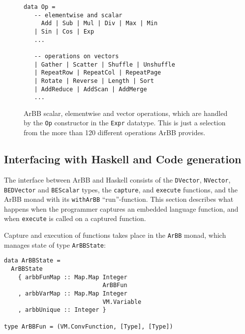 


\begin{figure} 
\begin{minipage}{\linewidth}
\begin{Verbatim}[frame=single]
data Op =  
   -- elementwise and scalar
     Add | Sub | Mul | Div | Max | Min 
   | Sin | Cos | Exp 
   ... 
   
   -- operations on vectors 
   | Gather | Scatter | Shuffle | Unshuffle
   | RepeatRow | RepeatCol | RepeatPage 
   | Rotate | Reverse | Length | Sort 
   | AddReduce | AddScan | AddMerge
   ... 
\end{Verbatim}
\end{minipage}
\caption{  ArBB scalar, elementwise and vector operations, which are handled by the {\tt Op} constructor in the {\tt Expr} datatype.
          This is just a selection from the more than 120 different operations ArBB provides.}
\label{fig:OPS}
\end{figure}

\FloatBarrier

\subsection{Interfacing with Haskell and Code generation} 

The interface between ArBB and Haskell consists of the {\tt DVector}, {\tt NVector}, {\tt BEDVector} and {\tt BEScalar} types, 
the {\tt capture}, and {\tt execute} functions, and the ArBB monad with its {\tt withArBB} 
``run''-function. This section describes what happens when the programmer captures 
an embedded language function, and when {\tt execute} is called on a captured
function. 

Capture and execution of functions takes place in the {\tt ArBB} monad, which
manages state of type {\tt ArBBState}:

\begin{verbatim}
data ArBBState = 
  ArBBState 
    { arbbFunMap :: Map.Map Integer 
                            ArBBFun        
    , arbbVarMap :: Map.Map Integer 
                            VM.Variable 
    , arbbUnique :: Integer } 

type ArBBFun = (VM.ConvFunction, [Type], [Type])
\end{verbatim}

